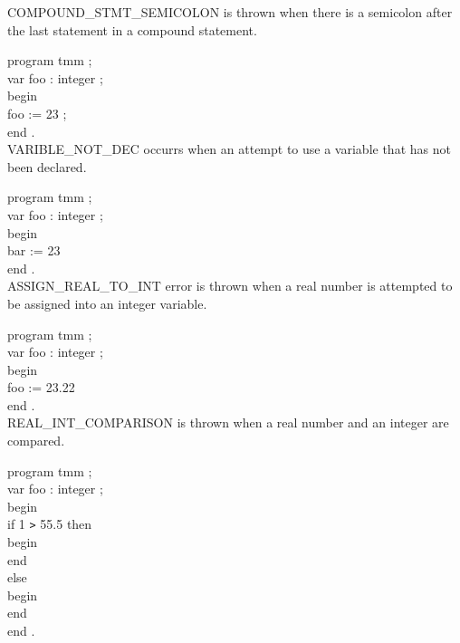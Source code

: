 \documentclass[12pt]{scrreprt}
\newcommand{\tab}{\hspace*{2em}}
\begin{document}
COMPOUND\_STMT\_SEMICOLON is thrown when there is a semicolon after the
last statement in a compound statement.

program tmm ; \\
var foo : integer ; \\
begin \\
\tab foo :=  23 ; \\
end . \\

VARIBLE\_NOT\_DEC occurrs when an attempt to use a variable that has not
been declared.

program tmm ; \\
var foo : integer ; \\
begin \\
\tab bar :=  23  \\
end . \\

ASSIGN\_REAL\_TO\_INT error is thrown when a real number is attempted to
be assigned into an integer variable.

program tmm ; \\
var foo : integer ; \\
begin \\
\tab foo :=  23.22  \\
end . \\

REAL\_INT\_COMPARISON is thrown when a real number and an integer are compared.

program tmm ; \\
var foo : integer ; \\
begin \\
if 1 \verb|>| 55.5 then \\
\tab	begin \\
\tab	end \\
else \\
\tab	begin \\
\tab	end \\
end . \\
\end{document}
